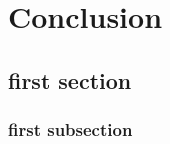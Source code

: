 \chapter{Conclusion} \label{ch:conclusion}



\section{first section}
\subsection{first subsection}
%
